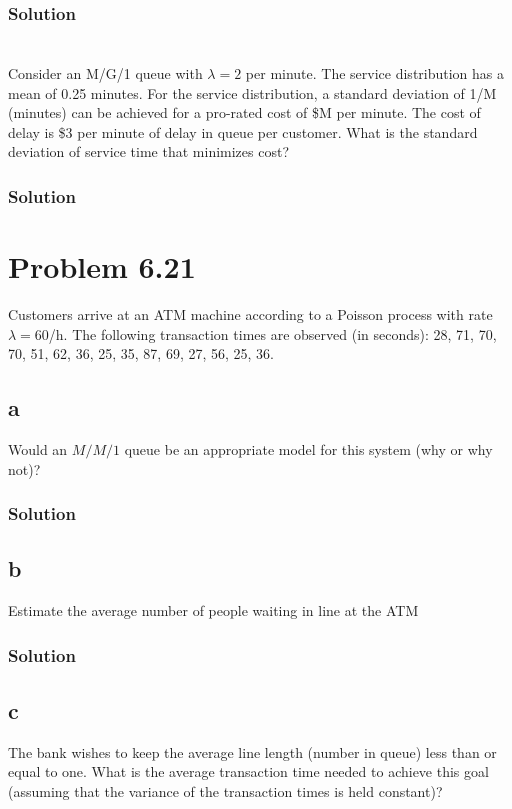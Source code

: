 \documentclass[letterpaper]{amsart}
\begin{document}
\subsubsection*{Solution}

\section{} %
Consider an M/G/1 queue with $\lambda = 2$ per minute. The service distribution has a
mean of 0.25 minutes. For the service distribution, a standard deviation of 1/M
(minutes) can be achieved for a pro-rated cost of \$M per minute. The cost of
delay is \$3 per minute of delay in queue per customer. What is the standard
deviation of service time that minimizes cost?
\subsubsection*{Solution}

\section{Problem 6.21} %
Customers arrive at an ATM machine according to a Poisson process with
rate $\lambda= 60$/h. The following transaction times are observed (in seconds):
28, 71, 70, 70, 51, 62, 36, 25, 35, 87, 69, 27, 56, 25, 36.
\subsection*{a}
Would an $M/M/1$ queue be an appropriate model for this system (why
or why not)?
\subsubsection*{Solution}
\subsection*{b}
Estimate the average number of people waiting in line at the ATM
\subsubsection*{Solution}
\subsection*{c}
The bank wishes to keep the average line length (number in queue) less
than or equal to one. What is the average transaction time needed to
achieve this goal (assuming that the variance of the transaction times is
held constant)?
\end{document}

